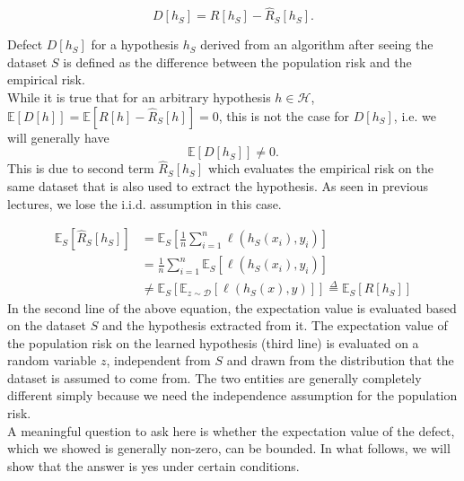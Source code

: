 \documentclass{article}
\begin{document}





 
\begin{defn}[Defect]\label{defect}
\[
	D[h_S] = R[h_{S}] - \hat{R}_{S}[h_S].
\]
\end{defn}
Defect $D[h_S]$ for a hypothesis $h_S$ derived from an algorithm after seeing the dataset $S$ is defined as  the difference between the population risk and the empirical risk. \\

While it is true that 
for an arbitrary hypothesis $h \in \mathcal{H}$,\;
	$\mathbb{E}[{D}[h]]=\mathbb{E}[R[h] - \hat{R}_S[h]]=0$,
this is not the case for $D[h_S]$, i.e. we will generally have   
\[
	\mathbb{E}[D[h_S]] \neq 0.
\]
This is due to second term $\hat{R}_{S}[h_S]$ which evaluates the empirical risk on the same  dataset that is also used to extract the hypothesis. As seen in previous lectures, we lose the i.i.d. assumption in this case.

\begin{align*}
    \mathbb{E}_S[\hat{R}_{S}[h_S]]
    &=\mathbb{E}_S[\frac{1}{n}\sum_{i=1}^n \ell(h_S(x_{i}),y_{i})]\\
    &=\frac{1}{n}\sum_{i=1}^n\mathbb{E}_S[ \ell(h_S(x_{i}),y_{i})]\\
    &\neq \mathbb{E}_S[\mathbb{E}_{z \sim \mathcal{D}} \left[\ell(h_S(x),y)\right]]\overset{\Delta}{=}\mathbb{E}_S[{R}[h_S]]
\end{align*}
In the second line of the above equation, the expectation value is evaluated based on the dataset $S$ and the hypothesis extracted from it.  
The expectation value of the population risk on the learned hypothesis (third line) is evaluated on a random variable $z$, independent from $S$ and drawn from the distribution that the dataset is assumed to come from. 
The two entities are generally completely different simply because we need the independence assumption for the population risk.\\ 

A meaningful question to ask here is whether the expectation value of the defect, which we showed is generally non-zero, can be bounded. In what follows, we will show that the answer is yes under certain conditions.  
  	
\end{document}
